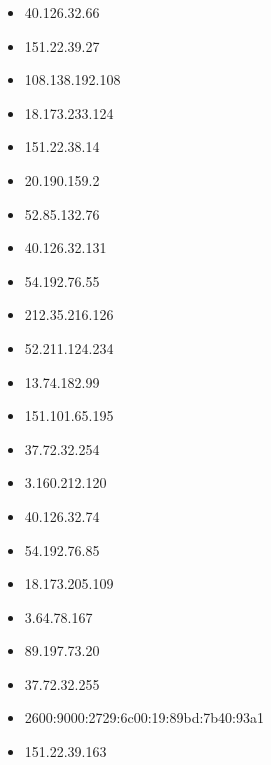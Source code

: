 \documentclass{article}
\begin{document}
\begin{itemize}
        \item 40.126.32.66
    
        \item 151.22.39.27
    
        \item 108.138.192.108
    
        \item 18.173.233.124
    
        \item 151.22.38.14
    
        \item 20.190.159.2
    
        \item 52.85.132.76
    
        \item 40.126.32.131
    
        \item 54.192.76.55
    
        \item 212.35.216.126
    
        \item 52.211.124.234
    
        \item 13.74.182.99
    
        \item 151.101.65.195
    
        \item 37.72.32.254
    
        \item 3.160.212.120
    
        \item 40.126.32.74
    
        \item 54.192.76.85
    
        \item 18.173.205.109
    
        \item 3.64.78.167
    
        \item 89.197.73.20
    
        \item 37.72.32.255
    
        \item 2600:9000:2729:6c00:19:89bd:7b40:93a1
    
        \item 151.22.39.163
    

\end{itemize}
\end{document}
